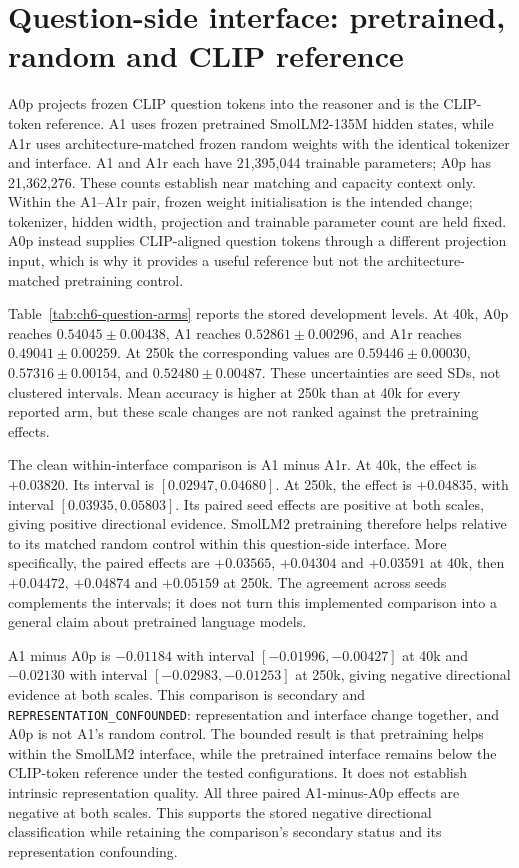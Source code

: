 \section{Question-side interface: pretrained, random and CLIP reference}
\label{sec:ch6-question}
A0p projects frozen CLIP question tokens into the reasoner and is the CLIP-token
reference. A1 uses frozen pretrained SmolLM2-135M hidden states, while A1r uses
architecture-matched frozen random weights with the identical tokenizer and
interface. A1 and A1r each have 21,395,044 trainable parameters; A0p has
21,362,276. These counts establish near matching and capacity context only.
Within the A1--A1r pair, frozen weight initialisation is the intended change;
tokenizer, hidden width, projection and trainable parameter count are held
fixed. A0p instead supplies CLIP-aligned question tokens through a different
projection input, which is why it provides a useful reference but not the
architecture-matched pretraining control.

Table~\ref{tab:ch6-question-arms} reports the stored development levels. At
40k, A0p reaches $0.54045\pm0.00438$, A1 reaches
$0.52861\pm0.00296$, and A1r reaches $0.49041\pm0.00259$.
At 250k the corresponding values are $0.59446\pm0.00030$,
$0.57316\pm0.00154$, and $0.52480\pm0.00487$. These uncertainties are seed
SDs, not clustered intervals. Mean accuracy is higher at 250k than at 40k for
every reported arm, but these scale changes are not ranked against the
pretraining effects.

The clean within-interface comparison is A1 minus A1r. At 40k, the effect is
$+0.03820$. Its interval is $[0.02947,0.04680]$. At 250k, the effect is
$+0.04835$, with interval $[0.03935,0.05803]$. Its paired seed effects are positive at both
scales, giving positive directional evidence. SmolLM2 pretraining therefore
helps relative to its matched random control within this question-side
interface. More specifically, the paired effects are $+0.03565$, $+0.04304$
and $+0.03591$ at 40k, then $+0.04472$, $+0.04874$ and $+0.05159$ at
250k. The agreement across seeds complements the intervals; it does not turn
this implemented comparison into a general claim about pretrained language
models.

A1 minus A0p is $-0.01184$ with interval $[-0.01996,-0.00427]$ at 40k and
$-0.02130$ with interval $[-0.02983,-0.01253]$ at 250k, giving negative
directional evidence at both scales. This comparison is secondary and
\texttt{REPRESENTATION\_CONFOUNDED}: representation and interface change
together, and A0p is not A1's random control. The bounded result is that
pretraining helps within the SmolLM2 interface, while the pretrained interface
remains below the CLIP-token reference under the tested configurations. It
does not establish intrinsic representation quality. All three paired
A1-minus-A0p effects are negative at both scales. This supports the stored
negative directional classification while retaining the comparison's
secondary status and its representation confounding.

